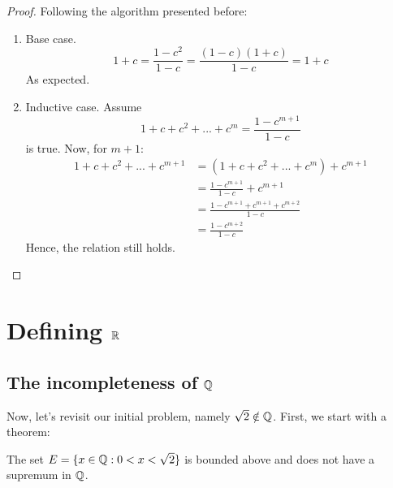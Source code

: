 \begin{proof}
    Following the algorithm presented before:
    \begin{enumerate}
        \item Base case.
            \begin{equation}
                1 + c = \frac{1-c^2}{1 - c} = \frac{(1-c)(1+c)}{1-c} = 1 + c
            \end{equation}
            As expected.
        \item Inductive case.
            Assume
            \begin{equation}
                1 + c + c^2 + ... + c^m = \frac{1-c^{m+1}}{1-c}
            \end{equation}
            is true. Now, for $m+1$:
            \begin{equation}
                \begin{split}
                    1 + c + c^2 + ... + c^{m+1} & = (1 + c + c^2 + ... +c^{m}) + c^{m+1} \\
                    & = \frac{1-c^{m+1}}{1-c} + c^{m+1} \\
                    & = \frac{1-c^{m+1} + c^{m+1} + c^{m+2}}{1-c} \\
                    & = \frac{1-c^{m+2}}{1-c}
                \end{split}
            \end{equation}
            Hence, the relation still holds.
    \end{enumerate}
\end{proof}

\section{Defining $\mathbb{R}$}

\subsection{The incompleteness of $\mathbb{Q}$}

Now, let's revisit our initial problem, namely $\sqrt{2} \notin \mathbb{Q}$. First, we start with a theorem:

\begin{theorem}
    The set $E = \{ x \in \mathbb{Q}: 0 < x < \sqrt{2}\}$ is bounded above and does not have a supremum in $\mathbb{Q}$.
\end{theorem}

